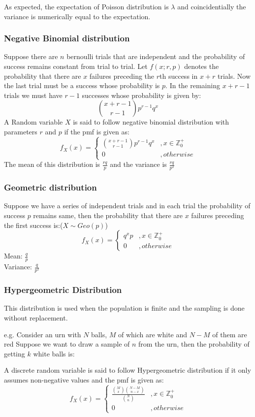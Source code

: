 \documentclass[11pt,letterpaper]{article}
\begin{document}
\noindent As expected, the expectation of Poisson distribution is $\lambda$ and coincidentially
the variance is numerically equal to the expectation. 
\subsubsection{Negative Binomial distribution}
Suppose there are $n$ bernoulli trials that are independent and the probability of
success remains constant from trial to trial. Let $f(x;r,p)$ denotes the probability
that there are $x$ failures preceding the $r$th success in $x+r$ trials. Now the
last trial must be a success whose probability is $p$. In the remaining $x+r-1$
trials we must have $r-1$ successes whose probability is given by:
\[
  {x+r-1 \choose r-1} p^{r-1} q^{x}
\]
A Random variable $X$ is said to follow negative binomial distribution with parameters 
$r$ and $p$ if the pmf is given as:
\[
  f_X(x) = \begin{cases}  {x+r-1 \choose r-1} p^{r-1} q^{x} &, x \in \mathbb{Z}^+_0 \\ 
  0 &, otherwise \end{cases}
\]
The mean of this distribution is $\frac{rq}{p}$ and the variance is $\frac{rq}{p^2}$

\subsubsection{Geometric distribution}
Suppose we have a series of independent trials and in each trial the probability
of success $p$ remains same, then the probability that there are $x$ failures
preceding the first success is:($X \sim Geo(p)$)
\[
  f_X(x) = \begin{cases} q^xp &, x \in \mathbb{Z}^+_0 \\ 
  0 &, otherwise\end{cases}
\]
Mean: $\frac{q}{p}$\\
Variance: $\frac{q}{p^2}$

\subsubsection{Hypergeometric Distribution}
This distribution is used when the population is finite and the sampling is done 
without replacement. 

e.g. Consider an urn with $N$ balls, $M$ of which are white and $N-M$ of them are red
Suppose we want to draw a sample of $n$ from the urn, then the probability of getting $k$ white 
balls is:

A discrete random variable is said to follow Hypergeometric distribution if it only 
assumes non-negative values and the pmf is given as:
\[
  f_X(x) = \begin{cases} \frac{{M\choose x} {N-M \choose n-x}}{{N \choose n}} &, x \in \mathbb{Z}^+_0\\
    0 &, otherwise
  \end{cases}
\]
\end{document}
